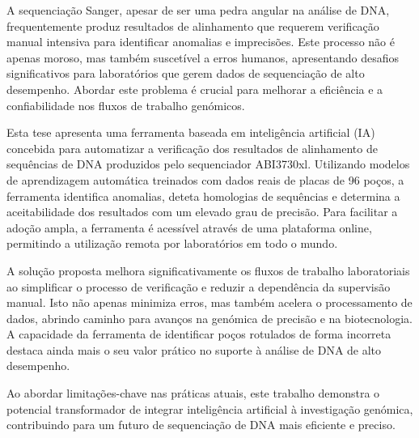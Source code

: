 
%

A sequenciação Sanger, apesar de ser uma pedra angular na análise de DNA, frequentemente produz resultados de alinhamento que requerem verificação manual intensiva para identificar anomalias e imprecisões. Este processo não é apenas moroso, mas também suscetível a erros humanos, apresentando desafios significativos para laboratórios que gerem dados de sequenciação de alto desempenho. Abordar este problema é crucial para melhorar a eficiência e a confiabilidade nos fluxos de trabalho genómicos.

Esta tese apresenta uma ferramenta baseada em inteligência artificial (IA) concebida para automatizar a verificação dos resultados de alinhamento de sequências de DNA produzidos pelo sequenciador ABI3730xl. Utilizando modelos de aprendizagem automática treinados com dados reais de placas de 96 poços, a ferramenta identifica anomalias, deteta homologias de sequências e determina a aceitabilidade dos resultados com um elevado grau de precisão. Para facilitar a adoção ampla, a ferramenta é acessível através de uma plataforma online, permitindo a utilização remota por laboratórios em todo o mundo.

A solução proposta melhora significativamente os fluxos de trabalho laboratoriais ao simplificar o processo de verificação e reduzir a dependência da supervisão manual. Isto não apenas minimiza erros, mas também acelera o processamento de dados, abrindo caminho para avanços na genómica de precisão e na biotecnologia. A capacidade da ferramenta de identificar poços rotulados de forma incorreta destaca ainda mais o seu valor prático no suporte à análise de DNA de alto desempenho.

Ao abordar limitações-chave nas práticas atuais, este trabalho demonstra o potencial transformador de integrar inteligência artificial à investigação genómica, contribuindo para um futuro de sequenciação de DNA mais eficiente e preciso.

%
%

